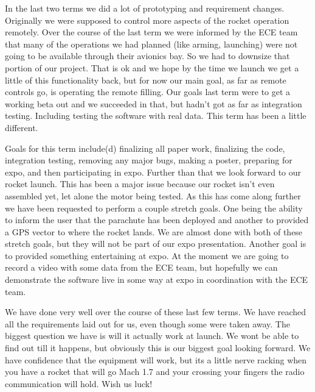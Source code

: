 \documentclass[10pt,draftclsnofoot,onecolumn]{IEEEtran}
\begin{document}
In the last two terms we did a lot of prototyping and requirement changes. Originally we were supposed to control more aspects of the rocket operation remotely. Over the course of the last term we were informed by the ECE team that many of the operations we had planned (like arming, launching) were not going to be available through their avionics bay. So we had to downsize that portion of our project. That is ok and we hope by the time we launch we get a little of this functionality back, but for now our main goal, as far as remote controls go, is operating the remote filling. Our goals last term were to get a working beta out and we succeeded in that, but hadn't got as far as integration testing. Including testing the software with real data. This term has been a little different. \par

Goals for this term include(d) finalizing all paper work, finalizing the code, integration testing, removing any major bugs, making a poster, preparing for expo, and then participating in expo. Further than that we look forward to our rocket launch. This has been a major issue because our rocket isn't even assembled yet, let alone the motor being tested. As this has come along further we have been requested to perform a couple stretch goals. One being the ability to inform the user that the parachute has been deployed and another to provided a GPS vector to where the rocket lands. We are almost done with both of these stretch goals, but they will not be part of our expo presentation. Another goal is to provided something entertaining at expo. At the moment we are going to record a video with some data from the ECE team, but hopefully we can demonstrate the software live in some way at expo in coordination with the ECE team. \par

We have done very well over the course of these last few terms. We have reached all the requirements laid out for us, even though some were taken away. The biggest question we have is will it actually work at launch. We wont be able to find out till it happens, but obviously this is our biggest goal looking forward. We have confidence that the equipment will work, but its a little nerve racking when you have a rocket that will go Mach 1.7 and your crossing your fingers the radio communication will hold. Wish us luck! \par
\end{document}
